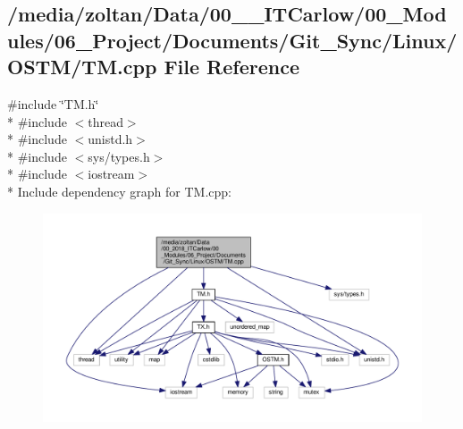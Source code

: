 \subsection{/media/zoltan/\+Data/00\+\_\+\_\+\+I\+T\+Carlow/00\+\_\+\+Modules/06\+\_\+\+Project/\+Documents/\+Git\+\_\+\+Sync/\+Linux/\+O\+S\+T\+M/\+TM.cpp File Reference}
\label{_t_m_8cpp}
{\ttfamily \#include \char`\"{}T\+M.\+h\char`\"{}}\\*
{\ttfamily \#include $<$thread$>$}\\*
{\ttfamily \#include $<$unistd.\+h$>$}\\*
{\ttfamily \#include $<$sys/types.\+h$>$}\\*
{\ttfamily \#include $<$iostream$>$}\\*
Include dependency graph for T\+M.\+cpp\+:\nopagebreak
\begin{figure}[H]
\begin{center}
\leavevmode
\includegraphics[width=350pt]{_t_m_8cpp__incl}
\end{center}
\end{figure}
